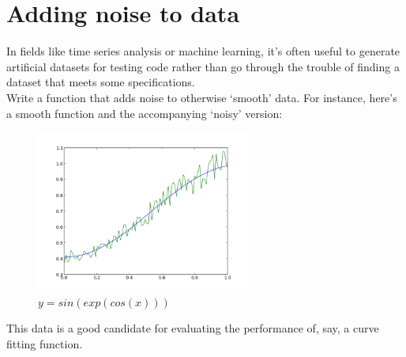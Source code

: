\documentclass{article}
\begin{document}
\section*{Adding noise to data}
In fields like time series analysis or machine learning, it's often useful
to generate artificial datasets for testing code rather than go through the 
trouble of finding a dataset that meets some specifications. \newline \\
Write a function that adds noise to otherwise `smooth' data. For instance, here's
a smooth function and the accompanying `noisy' version:
\begin{figure}[h]
\begin{center}
\includegraphics[height=150pt]{../pictures/noise.png}
\caption{$ y = sin(exp(cos(x))) $}
\end{center}
\end{figure}

This data is a good candidate for evaluating the performance of, say, a curve 
fitting function.
\end{document}
